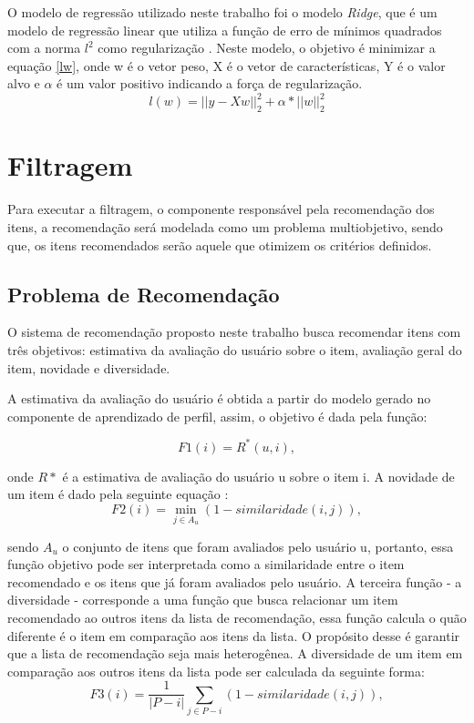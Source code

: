 O modelo de regressão utilizado neste trabalho foi o modelo \textit{Ridge}, que é um modelo de regressão linear que utiliza a função de erro de mínimos quadrados com a norma \(l^2 \) como regularização \cite{scikit-learn}. Neste modelo, o objetivo é minimizar a equação \ref{lw}, onde w é o vetor peso, X é o vetor de características, Y é o valor alvo e $\alpha$ é um valor positivo indicando a força de regularização.
\begin{equation}
\label{lw}
    l(w) = ||y - Xw||^2_2 + \alpha * ||w||^2_2
\end{equation}

\section{Filtragem}
Para executar a filtragem, o componente responsável pela recomendação dos itens, a recomendação será modelada como um problema multiobjetivo, sendo que, os itens recomendados serão aquele que otimizem os critérios definidos. 

\subsection{Problema de Recomendação}
O sistema de recomendação proposto neste trabalho busca recomendar itens com três objetivos: estimativa da avaliação do usuário sobre o item, avaliação geral do item, novidade e diversidade.

A estimativa da avaliação do usuário é obtida a partir do modelo gerado no componente de aprendizado de perfil, assim, o objetivo é dada pela função:

\begin{equation}
\label{F1}
    F1(i) = R^*(u, i),
\end{equation}

onde \(R*\) é a estimativa de avaliação do usuário u sobre o item i. A novidade de um item  é dado pela seguinte equação \cite{zhang2013}:
\begin{equation}
\label{F2}
    F2(i) = \min_{j \in A_u} (1 - similaridade(i,j)),
\end{equation}        

sendo \(A_u\) o conjunto de itens que foram avaliados pelo usuário u, portanto, essa função objetivo pode ser interpretada como a similaridade entre o item recomendado e os itens que já foram avaliados pelo usuário. A terceira função - a diversidade - corresponde a uma função que busca relacionar um item recomendado ao outros itens da lista de recomendação, essa função calcula o quão diferente é o item em comparação aos itens da lista. O propósito desse é garantir que a lista de recomendação seja mais heterogênea. A diversidade de um item em comparação aos outros itens da lista pode ser calculada da seguinte forma:
\begin{equation}
\label{F3}
    F3(i) = \frac{1}{|P-i|}\sum_{j \in P - i} (1 - similaridade(i,j)), 
\end{equation}

